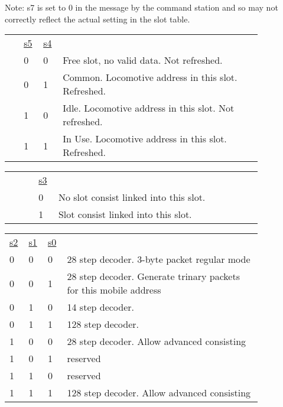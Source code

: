 Note: s7 is set to 0 in the message by the command station and so may not correctly reflect the actual setting in the slot table.\\


\begin{tabular}{p{0.05\linewidth} p{0.05\linewidth} p{0.05\linewidth} p{0.70\linewidth}} 
& \underline{s5} & \underline{s4} & \\
& 0 & 0 & Free slot, no valid data. Not refreshed.\\
& 0 & 1 & Common. Locomotive address in this slot. Refreshed.\\
& 1 & 0 & Idle. Locomotive address in this slot. Not refreshed.\\
& 1 & 1 & In Use. Locomotive address in this slot. Refreshed. \\
\end{tabular}

 \begin{tabular}{p{0.05\linewidth} p{0.05\linewidth} p{0.05\linewidth} p{0.70\linewidth}} 
& & \underline{s3} & \\
& & 0 & No slot consist linked into this slot.\\
& & 1 & Slot consist linked into this slot.\\
\end{tabular}



\begin{tabular}{p{0.05\linewidth} p{0.05\linewidth} p{0.05\linewidth} p{0.70\linewidth}} 
\underline{s2} & \underline{s1} & \underline{s0} & \\
0 & 0 & 0 & 28 step decoder. 3-byte packet regular mode\\
0 & 0 & 1 & 28 step decoder. Generate trinary packets for this mobile address\\
0 & 1 & 0 & 14 step decoder. \\
0 & 1 & 1 & 128 step decoder. \\
1 & 0 & 0 & 28 step decoder. Allow advanced consisting\\
1 & 0 & 1 & reserved\\
1 & 1 & 0 & reserved\\
1 & 1 & 1 & 128 step decoder. Allow advanced consisting\\
\end{tabular}

